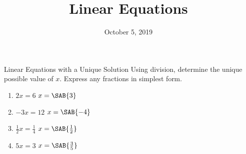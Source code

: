 \documentclass[12pt,letterpaper]{article}
\title{Linear Equations}
\date{October 5, 2019}
\begin{document}
\maketitle

\thispagestyle{empty}


\begin{problem}{Linear Equations with a Unique Solution}
  Using division, determine the unique possible value of \(x\). Express any fractions in
  simplest form.

  \begin{multicols}{2}
  \begin{enumerate}[\hspace{.5cm}a.]
    \item \( 2x = 6 \)     \hfill \(x = \SAB{3}\)
    \item \( -3x = 12 \)   \hfill \(x = \SAB{-4}\)
    \item \( \displaystyle \frac{1}{2}x = \frac{1}{4} \)
    \hfill \(x = \SAB{\frac{1}{2}}\)
    \item \( 5x = 3 \)     \hfill \(x = \SAB{\frac{3}{5}}\)
  \end{enumerate}
  \end{multicols}
\end{problem}
\end{document}
